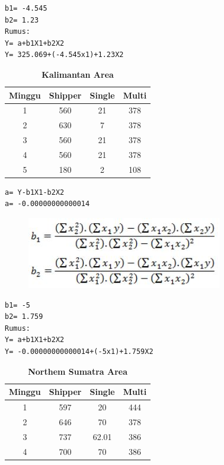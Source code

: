 \begin{enumerate}
\begin{lstlisting}
b1= -4.545
b2= 1.23
Rumus:
Y= a+b1X1+b2X2
Y= 325.069+(-4.545x1)+1.23X2
\end{lstlisting}
\vspace{6cm}
\begin{table}[]
  \captionsetup{singlelinecheck=off}
  \caption{\textbf{Kalimantan Area}}
\begin{tabular}{|c|c|c|c|}
\hline
Minggu & Shipper & Single & Multi \\ \hline
1      & 560     & 21     & 378   \\ \hline
2      & 630     & 7     & 378   \\ \hline
3      & 560     & 21     & 378   \\ \hline
4      & 560     & 21     & 378   \\ \hline
5      & 180     & 2     & 108   \\ \hline
\end{tabular}
\end{table}
\newpage \begin{lstlisting}
a= Y-b1X1-b2X2      
a= -0.00000000000014
\end{lstlisting}
\begin{figure}[!htbp]
\includegraphics[scale=0.6]{chapters/figures/b1b2.JPG}
    \label{Figure4}
\end{figure}
\begin{lstlisting}
b1= -5
b2= 1.759
Rumus:
Y= a+b1X1+b2X2
Y= -0.00000000000014+(-5x1)+1.759X2
\end{lstlisting}
\vspace{6cm}
\begin{table}[]
  \captionsetup{singlelinecheck=off}
  \caption{\textbf{Northem Sumatra Area}}
\begin{tabular}{|c|c|c|c|}
\hline
Minggu & Shipper & Single & Multi \\ \hline
1      & 597     & 20     & 444   \\ \hline
2      & 646     & 70     & 378   \\ \hline
3      & 737     & 62.01     & 386   \\ \hline
4      & 700     & 70     & 386   \\ \hline

\end{tabular}
\end{table}
\end{enumerate}
